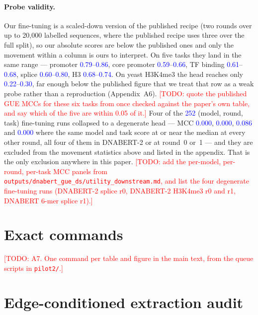 \documentclass[10pt,letterpaper]{article}
\newcommand{\TODO}[1]{\textcolor{red}{[TODO: #1]}}
\newcommand{\NUM}[1]{\textcolor{blue}{#1}}
\begin{document}
\paragraph{Probe validity.}
Our fine-tuning is a scaled-down version of the published recipe (two rounds over up to 20{,}000
labelled sequences, where the published recipe uses three over the full split), so our absolute
scores are below the published ones and only the movement within a column is ours to interpret. On
five tasks they land in the same range --- promoter \NUM{0.79}--\NUM{0.86}, core promoter
\NUM{0.59}--\NUM{0.66}, TF binding \NUM{0.61}--\NUM{0.68}, splice \NUM{0.60}--\NUM{0.80}, H3
\NUM{0.68}--\NUM{0.74}. On yeast H3K4me3 the head reaches only \NUM{0.22}--\NUM{0.30}, far enough
below the published figure that we treat that row as a weak probe rather than a reproduction
(Appendix~A6). \TODO{quote the published GUE MCCs for these six tasks from
\cite{zhou2024dnabert2} once checked against the paper's own table, and say which of the five are
within 0.05 of it.} Four of the \NUM{252} (model, round, task) fine-tuning runs collapsed to a
degenerate head --- MCC \NUM{0.000}, \NUM{0.000}, \NUM{0.086} and \NUM{0.000} where the same model
and task score at or near the median at every other round, all four of them in DNABERT-2 or at
round~0 or~1 --- and they are excluded from the movement statistics above and listed in the
appendix. That is the only exclusion anywhere in this paper.
\TODO{add the per-model, per-round, per-task MCC panels from
\texttt{outputs/dnabert\_gue\_ds/utility\_downstream.md}, and list the four degenerate fine-tuning
runs (DNABERT-2 splice r0, DNABERT-2 H3K4me3 r0 and r1, DNABERT 6-mer splice r1).}

\section{Exact commands}
\TODO{A7. One command per table and figure in the main text, from the queue scripts in
\texttt{pilot2/}.}

\section{Edge-conditioned extraction audit}
\end{document}
